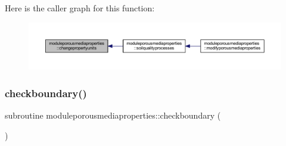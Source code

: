 Here is the caller graph for this function\+:\nopagebreak
\begin{figure}[H]
\begin{center}
\leavevmode
\includegraphics[width=350pt]{namespacemoduleporousmediaproperties_a4f575711195b1879221a0c494292c90c_icgraph}
\end{center}
\end{figure}
\mbox{\label{namespacemoduleporousmediaproperties_a9384815199fb37590dac347563039152}} 
\subsubsection{\texorpdfstring{checkboundary()}{checkboundary()}}
{\footnotesize\ttfamily subroutine moduleporousmediaproperties\+::checkboundary (\begin{DoxyParamCaption}{ }\end{DoxyParamCaption})\hspace{0.3cm}{\ttfamily [private]}}


